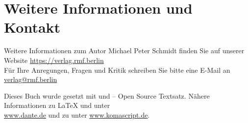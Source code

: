 \chapter*{Weitere Informationen und Kontakt} %
\label{cha:mehr_informationen}



%


\noindent Weitere Informationen zum Autor Michael Peter Schmidt finden Sie auf unserer Website \url{https://verlag.rmf.berlin}\\[12pt]


\noindent Für Ihre Anregungen, Fragen und Kritik schreiben Sie bitte eine E-Mail an \url{verlag@rmf.berlin}

\vspace{60pt}

\noindent Dieses Buch wurde gesetzt mit {\XeLaTeX} und {\KOMAScript} -- Open Source Textsatz. Nähere Informationen zu {\LaTeX} und  {\XeLaTeX} unter \\\url{www.dante.de} und zu {\KOMAScript} unter \url{www.komascript.de}.




